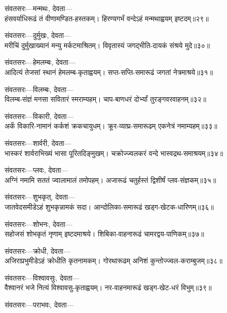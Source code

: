 संवतसरः---मन्मथः, देवता---\\

हंसवर्याधिरूढं तं वीणामण्डित-हस्तकम्।
हिरण्यगर्भं वन्देऽहं मन्मथाह्वयम् इष्टदम्॥२९॥

संवतसरः---दुर्मुखः, देवता---\\

मरीचिं दुर्मुखाख्यानं मन्यु मर्कटमाश्रितम्।
विवृतास्यं जगद्भीति-दायकं संश्रये मुदे॥३०॥

संवतसरः---हेमलम्बः, देवता---\\

आदित्यं तेजसां स्थानं हेमलम्ब-कृताह्वयम्।
सप्त-सप्ति-समारूढं जगतां नेत्रमाश्रये॥३१॥

संवतसरः---विलम्बः, देवता---\\

विलम्ब-संज्ञं मनसा सवितारं स्मराम्यहम्।
चाप-बाणधरं दोर्भ्यां तुरङ्गवरवाहनम्॥३२॥

संवतसरः---विकारी, देवता---\\

अर्कं विकारि-नामानं कर्कशं क्रकचायुधम्।
क्रूर-व्याघ्र-समारूढम् एकनेत्रं नमाम्यहम्॥३३॥

संवतसरः---शार्वरी, देवता---\\

भास्करं शार्वराभिख्यं भासा पूरितदिङ्मुखम्।
चक्रोज्ज्वलकरं वन्दे भास्वद्रथ-समाश्रयम्॥३४॥

संवतसरः---प्लवः, देवता---\\

अग्निं नमामि सततं ज्वालामालं तमोपहम्।
अजारूढं चतुर्हस्तं द्विशीर्षं प्लव-संज्ञकम्॥३५॥

संवतसरः---शुभकृत्, देवता---\\

जातवेदसमीडेऽहं शुभकृन्नामकं सदा।
आन्दोलिका-समारूढं खड्ग-खेटक-धारिणम्॥३६॥

संवतसरः---शोभनः, देवता---\\

सहोजसं शोभकृतं नृणाम् इष्टदमाश्रये।
शिबिका-वाहनारूढं चामरद्वय-पाणिकम्॥३७॥

संवतसरः---क्रोधी, देवता---\\

अजिराप्रभुमीडेऽहं क्रोधीति कृतनामकम्।
गोरथारूढम् अनिशं कुन्तोज्ज्वल-कराम्बुजम्॥३८॥

संवतसरः---विश्वावसुः, देवता---\\

वैश्वानरं भजे नित्यं विश्वावसु-कृताह्वयम्।
नर-वाहनमारूढं खड्ग-खेट-धरं विभुम्॥३९॥

संवतसरः---पराभवः, देवता---\\

